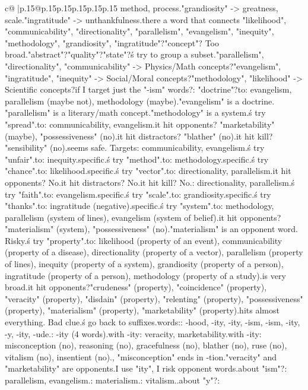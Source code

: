 \documentclass{article}
\begin{document}
{\begin{supertabular}{c@{$\;$}|p{.15\linewidth}@{}p{.15\linewidth}p{.15\linewidth}p{.15\linewidth}p{.15\linewidth}p{.15\linewidth}}
{{{method, process.\n"grandiosity" -> greatness, scale.\n"ingratitude" -> unthankfulness.\n\nIs there a word that connects "likelihood", "communicability", "directionality", "parallelism", "evangelism", "inequity", "methodology", "grandiosity", "ingratitude"?\nMaybe "concept"? Too broad.\nMaybe "abstract"?\nMaybe "quality"?\nMaybe "state"?\n\nLet\'s try to group a subset.\n"parallelism", "directionality", "communicability" -> Physics/Math concepts?\n"evangelism", "ingratitude", "inequity" -> Social/Moral concepts?\n"methodology", "likelihood" -> Scientific concepts?\n\nWhat if I target just the "-ism" words?\nClue: "doctrine"?\nRelates to: evangelism, parallelism (maybe not), methodology (maybe).\n"evangelism" is a doctrine. "parallelism" is a literary/math concept.\n"methodology" is a system.\n\nLet\'s try "spread".\nRelates to: communicability, evangelism.\nDoes it hit opponents? "marketability" (maybe), "possessiveness" (no).\nDoes it hit distractors? "blather" (no).\nDoes it hit kill? "sensibility" (no).\nThis seems safe. Targets: communicability, evangelism.\n\nLet\'s try "unfair".\nRelates to: inequity.\nToo specific.\n\nLet\'s try "method".\nRelates to: methodology.\nToo specific.\n\nLet\'s try "chance".\nRelates to: likelihood.\nToo specific.\n\nLet\'s try "vector".\nRelates to: directionality, parallelism.\nDoes it hit opponents? No.\nDoes it hit distractors? No.\nDoes it hit kill? No.\nTargets: directionality, parallelism.\n\nLet\'s try "faith".\nRelates to: evangelism.\nToo specific.\n\nLet\'s try "scale".\nRelates to: grandiosity.\nToo specific.\n\nLet\'s try "thanks".\nRelates to: ingratitude (negative).\nToo specific.\n\nLet\'s try "system".\nRelates to: methodology, parallelism (system of lines), evangelism (system of belief).\nDoes it hit opponents? "materialism" (system), "possessiveness" (no).\n"materialism" is an opponent word. Risky.\n\nLet\'s try "property".\nRelates to: likelihood (property of an event), communicability (property of a disease), directionality (property of a vector), parallelism (property of lines), inequity (property of a system), grandiosity (property of a person), ingratitude (property of a person), methodology (property of a study).\nThis is very broad.\nDoes it hit opponents?\n"crudeness" (property), "coincidence" (property), "veracity" (property), "disdain" (property), "relenting" (property), "possessiveness" (property), "materialism" (property), "marketability" (property).\nThis hits almost everything. Bad clue.\n\nLet\'s go back to suffixes.\nMy words:\nlikelihood\ncommunicability\ndirectionality\nparallelism\nevangelism\ninequity\nmethodology\ngrandiosity\ningratitude\n\nSuffixes: -hood, -ity, -ity, -ism, -ism, -ity, -y, -ity, -ude.\nCommon: -ity (4 words).\nOpponents with -ity: veracity, marketability.\nDistractors with -ity: misconception (no), reasoning (no), gracefulness (no), blather (no), ruse (no), vitalism (no), insentient (no).\nWait, "misconception" ends in -tion.\n"veracity" and "marketability" are opponents.\nIf I use "ity", I risk opponent words.\n\nWhat about "ism"?\nMy: parallelism, evangelism.\nOpponent: materialism.\nDistractor: vitalism.\nRisk.\n\nWhat about "y"?\nMy: }}}
\end{supertabular}}
\end{document}
